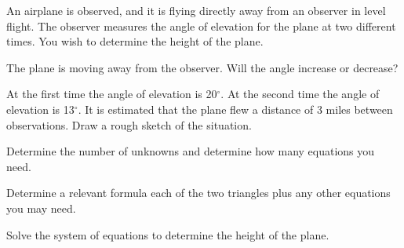 \begin{problem}
  \clearpage

  \item An airplane is observed, and it is flying directly away from an observer
    in level flight.
    The observer measures the angle of elevation for the plane at two different
    times. You wish to determine the height of the plane.
    \begin{subproblem}
      \item The plane is moving away from the observer. Will the angle increase
        or decrease?
        \vspace{2em}
      \item At the first time the angle of elevation is 20$^\circ$.
        At the second time the angle of elevation is 13$^\circ$.
        It is estimated that the plane flew a distance of 3 miles between observations.
        Draw a rough sketch of the situation.
        \vfill
        \item Determine the number of unknowns and determine how many equations you need.
          \vspace{1em}
      \item Determine a relevant formula each of the two triangles plus any
        other equations you may need.
        \vfill
      \item Solve the system of equations to determine the height of the plane.
        \vfill
        \vfill
    \end{subproblem}

\end{problem}

\postClass

